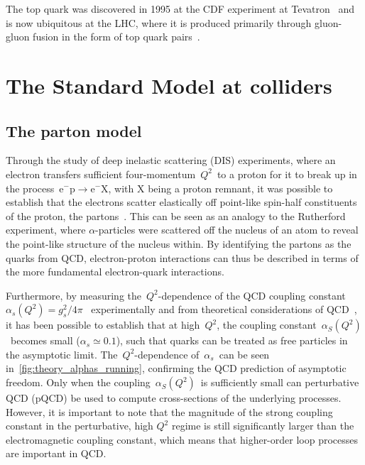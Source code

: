 The top quark was discovered in 1995 at the CDF experiment at Tevatron~\cite{Abe:1995hr} and is now ubiquitous at the LHC, where it is produced primarily through gluon-gluon fusion in the form of top quark pairs~\cite{Czakon:2013goa}.


\section{The Standard Model at colliders}
\subsection{The parton model}
Through the study of deep inelastic scattering (DIS) experiments, where an electron transfers sufficient four-momentum~$Q^2$~to a proton for it to break up in the process~$\mathrm{e}^- \mathrm{p} \rightarrow \mathrm{e}^- \mathrm{X}$, with $\mathrm{X}$ being a proton remnant, it was possible to establish that the electrons scatter elastically off point-like spin-half constituents of the proton, the partons~\cite{Bjorken:1969ja}. This can be seen as an analogy to the Rutherford experiment, where $\alpha$-particles were scattered off the nucleus of an atom to reveal the point-like structure of the nucleus within. By identifying the partons as the quarks from QCD, electron-proton interactions can thus be described in terms of the more fundamental electron-quark interactions.

Furthermore, by measuring the~$Q^2$-dependence of the QCD coupling constant~$\alpha_s(Q^2) = g_s^2 / 4\pi$~ experimentally and from theoretical considerations of QCD~\cite{PhysRevLett.30.1343,PhysRevLett.30.1346}, it has been possible to establish that at high~$Q^2$, the coupling constant~$\alpha_S(Q^2)$~becomes small ($\alpha_s \simeq 0.1$), such that quarks can be treated as free particles in the asymptotic limit. The~$Q^2$-dependence of~$\alpha_s$~can be seen in~\cref{fig:theory_alphas_running}, confirming the QCD prediction of asymptotic freedom. Only when the coupling~$\alpha_S(Q^2)$~is sufficiently small can perturbative QCD (pQCD) be used to compute cross-sections of the underlying processes. However, it is important to note that the magnitude of the strong coupling constant in the perturbative, high $Q^2$ regime is still significantly larger than the electromagnetic coupling constant, which means that higher-order loop processes are important in QCD.

